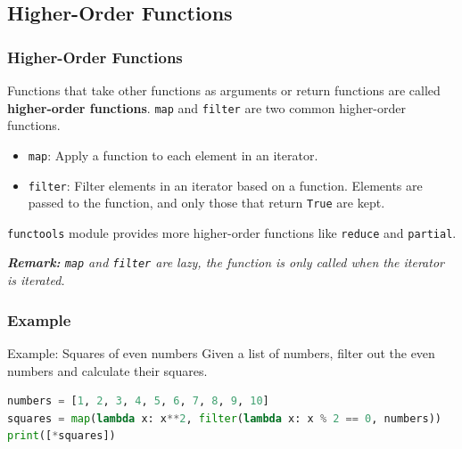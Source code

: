 \documentclass[beamer, en, version=2.0]{huangfusl-template}
\begin{document}
    \subsection{Higher-Order Functions}
    \begin{frame}[fragile]
        \frametitle{Higher-Order Functions}

        Functions that take other functions as arguments or return functions are called \textbf{higher-order functions}. {\footnotesize\verb|map|} and {\footnotesize\verb|filter|} are two common higher-order functions.

        \begin{itemize}
            \item {\footnotesize\verb|map|}: Apply a function to each element in an iterator.
            \item {\footnotesize\verb|filter|}: Filter elements in an iterator based on a function. Elements are passed to the function, and only those that return {\footnotesize\verb|True|} are kept.
        \end{itemize}

        {\footnotesize\verb|functools|} module provides more higher-order functions like {\footnotesize\verb|reduce|} and {\footnotesize\verb|partial|}.

        {\footnotesize\itshape\textbf{Remark:} {\scriptsize\verb|map|} and {\scriptsize\verb|filter|} are lazy, the function is only called when the iterator is iterated.}
    \end{frame}
    \begin{frame}[fragile]
        \frametitle{Example}

        \begin{block}{Example: Squares of even numbers}
            Given a list of numbers, filter out the even numbers and calculate their squares.
        \end{block}

        \pause

\begin{lstlisting}[language=python]
numbers = [1, 2, 3, 4, 5, 6, 7, 8, 9, 10]
squares = map(lambda x: x**2, filter(lambda x: x % 2 == 0, numbers))
print([*squares])
\end{lstlisting}
    \end{frame}
\end{document}
